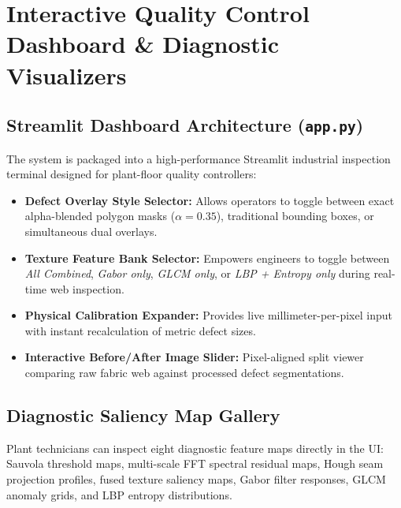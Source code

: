 \documentclass[10pt,a4paper]{article}
\begin{document}
\section{Interactive Quality Control Dashboard \& Diagnostic Visualizers}

\subsection{Streamlit Dashboard Architecture (\texttt{app.py})}
The system is packaged into a high-performance Streamlit industrial inspection terminal designed for plant-floor quality controllers:
\begin{itemize}[leftmargin=1.5em,itemsep=2pt]
    \item \textbf{Defect Overlay Style Selector:} Allows operators to toggle between exact alpha-blended polygon masks ($\alpha = 0.35$), traditional bounding boxes, or simultaneous dual overlays.
    \item \textbf{Texture Feature Bank Selector:} Empowers engineers to toggle between \textit{All Combined}, \textit{Gabor only}, \textit{GLCM only}, or \textit{LBP + Entropy only} during real-time web inspection.
    \item \textbf{Physical Calibration Expander:} Provides live millimeter-per-pixel input with instant recalculation of metric defect sizes.
    \item \textbf{Interactive Before/After Image Slider:} Pixel-aligned split viewer comparing raw fabric web against processed defect segmentations.
\end{itemize}

\subsection{Diagnostic Saliency Map Gallery}
Plant technicians can inspect eight diagnostic feature maps directly in the UI: Sauvola threshold maps, multi-scale FFT spectral residual maps, Hough seam projection profiles, fused texture saliency maps, Gabor filter responses, GLCM anomaly grids, and LBP entropy distributions.

\end{document}
